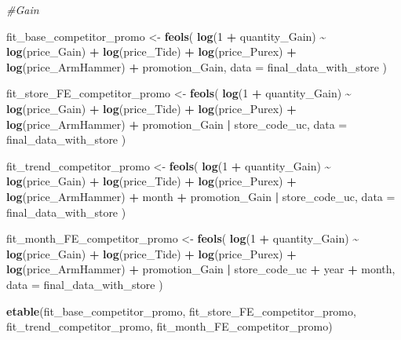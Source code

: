 \documentclass[
]{article}
\newenvironment{Shaded}{\begin{snugshade}}{\end{snugshade}}
\newcommand{\AttributeTok}[1]{\textcolor[rgb]{0.13,0.29,0.53}{#1}}
\newcommand{\CommentTok}[1]{\textcolor[rgb]{0.56,0.35,0.01}{\textit{#1}}}
\newcommand{\DecValTok}[1]{\textcolor[rgb]{0.00,0.00,0.81}{#1}}
\newcommand{\FunctionTok}[1]{\textcolor[rgb]{0.13,0.29,0.53}{\textbf{#1}}}
\newcommand{\NormalTok}[1]{#1}
\newcommand{\OtherTok}[1]{\textcolor[rgb]{0.56,0.35,0.01}{#1}}
\newcommand{\SpecialCharTok}[1]{\textcolor[rgb]{0.81,0.36,0.00}{\textbf{#1}}}
\begin{document}
\begin{Shaded}
\begin{Highlighting}[]
\CommentTok{\#Gain}

\NormalTok{fit\_base\_competitor\_promo }\OtherTok{\textless{}{-}} \FunctionTok{feols}\NormalTok{(}
  \FunctionTok{log}\NormalTok{(}\DecValTok{1} \SpecialCharTok{+}\NormalTok{ quantity\_Gain) }\SpecialCharTok{\textasciitilde{}} \FunctionTok{log}\NormalTok{(price\_Gain) }\SpecialCharTok{+} \FunctionTok{log}\NormalTok{(price\_Tide) }\SpecialCharTok{+} \FunctionTok{log}\NormalTok{(price\_Purex)}
  \SpecialCharTok{+} \FunctionTok{log}\NormalTok{(price\_ArmHammer) }\SpecialCharTok{+}\NormalTok{ promotion\_Gain,}
  \AttributeTok{data =}\NormalTok{ final\_data\_with\_store}
\NormalTok{)}

\NormalTok{fit\_store\_FE\_competitor\_promo }\OtherTok{\textless{}{-}} \FunctionTok{feols}\NormalTok{(}
  \FunctionTok{log}\NormalTok{(}\DecValTok{1} \SpecialCharTok{+}\NormalTok{ quantity\_Gain) }\SpecialCharTok{\textasciitilde{}} \FunctionTok{log}\NormalTok{(price\_Gain) }\SpecialCharTok{+} \FunctionTok{log}\NormalTok{(price\_Tide) }\SpecialCharTok{+} \FunctionTok{log}\NormalTok{(price\_Purex)}
  \SpecialCharTok{+} \FunctionTok{log}\NormalTok{(price\_ArmHammer) }\SpecialCharTok{+}\NormalTok{ promotion\_Gain }\SpecialCharTok{|}\NormalTok{ store\_code\_uc,}
  \AttributeTok{data =}\NormalTok{ final\_data\_with\_store}
\NormalTok{)}

\NormalTok{fit\_trend\_competitor\_promo }\OtherTok{\textless{}{-}} \FunctionTok{feols}\NormalTok{(}
  \FunctionTok{log}\NormalTok{(}\DecValTok{1} \SpecialCharTok{+}\NormalTok{ quantity\_Gain) }\SpecialCharTok{\textasciitilde{}} \FunctionTok{log}\NormalTok{(price\_Gain) }\SpecialCharTok{+} \FunctionTok{log}\NormalTok{(price\_Tide) }\SpecialCharTok{+} \FunctionTok{log}\NormalTok{(price\_Purex)}
  \SpecialCharTok{+} \FunctionTok{log}\NormalTok{(price\_ArmHammer) }\SpecialCharTok{+}\NormalTok{ month }\SpecialCharTok{+}\NormalTok{ promotion\_Gain }\SpecialCharTok{|}\NormalTok{ store\_code\_uc,}
  \AttributeTok{data =}\NormalTok{ final\_data\_with\_store}
\NormalTok{)}

\NormalTok{fit\_month\_FE\_competitor\_promo }\OtherTok{\textless{}{-}} \FunctionTok{feols}\NormalTok{(}
  \FunctionTok{log}\NormalTok{(}\DecValTok{1} \SpecialCharTok{+}\NormalTok{ quantity\_Gain) }\SpecialCharTok{\textasciitilde{}} \FunctionTok{log}\NormalTok{(price\_Gain) }\SpecialCharTok{+} \FunctionTok{log}\NormalTok{(price\_Tide) }\SpecialCharTok{+} \FunctionTok{log}\NormalTok{(price\_Purex)}
  \SpecialCharTok{+} \FunctionTok{log}\NormalTok{(price\_ArmHammer) }\SpecialCharTok{+}\NormalTok{ promotion\_Gain }\SpecialCharTok{|}\NormalTok{ store\_code\_uc }\SpecialCharTok{+}\NormalTok{ year }\SpecialCharTok{+}\NormalTok{ month,}
  \AttributeTok{data =}\NormalTok{ final\_data\_with\_store}
\NormalTok{)}

\FunctionTok{etable}\NormalTok{(fit\_base\_competitor\_promo, fit\_store\_FE\_competitor\_promo, }
\NormalTok{       fit\_trend\_competitor\_promo, fit\_month\_FE\_competitor\_promo)}
\end{Highlighting}
\end{Shaded}
\end{document}
